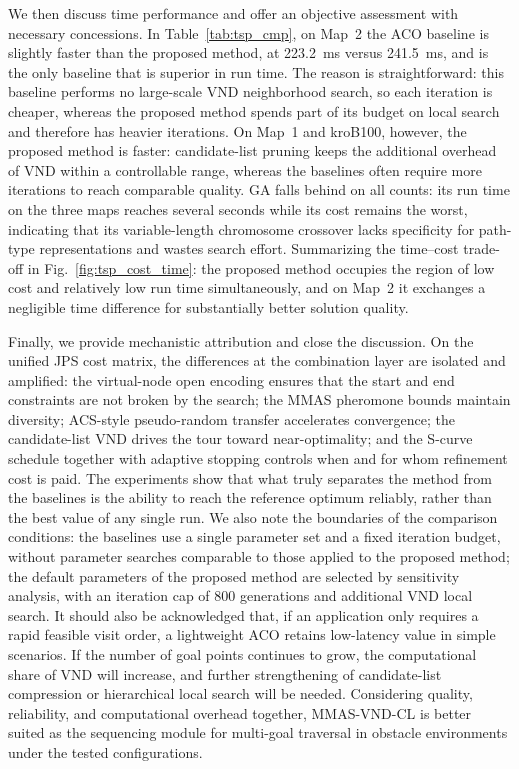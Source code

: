 \documentclass[lettersize,journal]{IEEEtran}
\begin{document}
We then discuss time performance and offer an objective assessment with necessary concessions. In Table~\textcolor{blue}{\ref{tab:tsp_cmp}}, on Map~2 the ACO baseline is slightly faster than the proposed method, at 223.2~ms versus 241.5~ms, and is the only baseline that is superior in run time. The reason is straightforward: this baseline performs no large-scale VND neighborhood search, so each iteration is cheaper, whereas the proposed method spends part of its budget on local search and therefore has heavier iterations. On Map~1 and kroB100, however, the proposed method is faster: candidate-list pruning keeps the additional overhead of VND within a controllable range, whereas the baselines often require more iterations to reach comparable quality. GA falls behind on all counts: its run time on the three maps reaches several seconds while its cost remains the worst, indicating that its variable-length chromosome crossover lacks specificity for path-type representations and wastes search effort. Summarizing the time--cost trade-off in Fig.~\textcolor{blue}{\ref{fig:tsp_cost_time}}: the proposed method occupies the region of low cost and relatively low run time simultaneously, and on Map~2 it exchanges a negligible time difference for substantially better solution quality.

Finally, we provide mechanistic attribution and close the discussion. On the unified JPS cost matrix, the differences at the combination layer are isolated and amplified: the virtual-node open encoding ensures that the start and end constraints are not broken by the search; the MMAS pheromone bounds maintain diversity; ACS-style pseudo-random transfer accelerates convergence; the candidate-list VND drives the tour toward near-optimality; and the S-curve schedule together with adaptive stopping controls when and for whom refinement cost is paid. The experiments show that what truly separates the method from the baselines is the ability to reach the reference optimum reliably, rather than the best value of any single run. We also note the boundaries of the comparison conditions: the baselines use a single parameter set and a fixed iteration budget, without parameter searches comparable to those applied to the proposed method; the default parameters of the proposed method are selected by sensitivity analysis, with an iteration cap of 800 generations and additional VND local search. It should also be acknowledged that, if an application only requires a rapid feasible visit order, a lightweight ACO retains low-latency value in simple scenarios. If the number of goal points continues to grow, the computational share of VND will increase, and further strengthening of candidate-list compression or hierarchical local search will be needed. Considering quality, reliability, and computational overhead together, MMAS-VND-CL is better suited as the sequencing module for multi-goal traversal in obstacle environments under the tested configurations.
\end{document}
